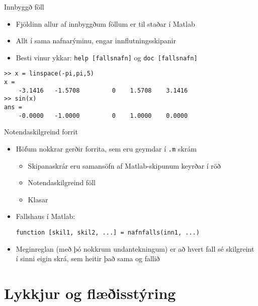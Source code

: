 \documentclass{beamer}
\begin{document}
\begin{frame}[fragile]{Innbyggð föll}
    \begin{itemize}
        \item Fjöldinn allur af innbyggðum föllum er til staðar í Matlab
        \item Allt í sama nafnarýminu, engar innflutningsskipanir
        \item Besti vinur ykkar: \texttt{help [fallsnafn]} og \texttt{doc [fallsnafn]}
    \end{itemize}
    \begin{verbatim}
>> x = linspace(-pi,pi,5)
x =
    -3.1416   -1.5708         0    1.5708    3.1416
>> sin(x)
ans =
    -0.0000   -1.0000         0    1.0000    0.0000  
    \end{verbatim}
\end{frame}

\begin{frame}[fragile]{Notendaskilgreind forrit}
    \begin{itemize}
        \item Höfum nokkrar gerðir forrita, sem eru geymdar í \texttt{.m} skrám
        \begin{itemize}
            \item Skipanaskrár  eru samansöfn af Matlab-skipunum keyrðar í röð
            \item Notendaskilgreind föll 
            \item Klasar
        \end{itemize}
        \item Fallshaus í Matlab:

        \begin{verbatim}
function [skil1, skil2, ...] = nafnfalls(inn1, ...)
        \end{verbatim}

        \item Meginreglan (með þó nokkrum undantekningum) er að hvert fall sé skilgreint í sinni eigin skrá, sem heitir það sama og fallið
    \end{itemize}
\end{frame}

\section{Lykkjur og flæðisstýring}
\end{document}
